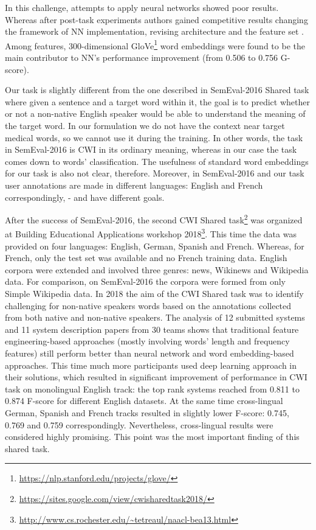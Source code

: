 In this challenge, attempts to apply neural networks showed poor results. Whereas after post-task experiments authors gained competitive results changing the framework of NN implementation, revising architecture and the feature set \citep{Bingel-SemEval2016}. Among features, 300-dimensional GloVe\footnote{\url{https://nlp.stanford.edu/projects/glove/}} word embeddings were found to be the main contributor to NN's performance improvement (from 0.506 to 0.756 G-score). 

Our task is slightly different from the one described in SemEval-2016 Shared task \citep{Paetzold-SemEval2016overview} where given a sentence and a target word within it, the goal is to predict whether or not a non-native English speaker would be able to understand the meaning of the target word. In our formulation we do not have the context near target medical words, so we cannot use it during the training. In other words, the task in SemEval-2016 is CWI in its ordinary meaning, whereas in our case the task comes down to words' classification. The usefulness of standard word embeddings for our task is also not clear, therefore. Moreover, in SemEval-2016 and our task user annotations are made in different languages: English and French correspondingly, -  and have different goals.

After the success of SemEval-2016, the second CWI Shared task\footnote{\url{https://sites.google.com/view/cwisharedtask2018/}} was organized at Building Educational Applications workshop 2018\footnote{\url{http://www.cs.rochester.edu/~tetreaul/naacl-bea13.html}}. This time the data was provided on four languages: English, German, Spanish and French. Whereas, for French, only the test set was available and no French training data. English corpora were extended and involved three genres: news, Wikinews and Wikipedia data. For comparison, on SemEval-2016 the corpora were formed from only Simple Wikipedia data. In 2018 the aim of the CWI Shared
task was to identify challenging for non-native speakers words based on the annotations collected from both native and non-native speakers. 
The analysis \citep{Yimam-BEA2018} of 12 submitted systems and 11 system description papers from 30 teams shows that traditional feature engineering-based approaches (mostly involving words' length and frequency features) still perform better than neural network and word embedding-based approaches. This time much more participants used deep learning approach in their solutions, which resulted in significant improvement of performance in CWI task on monolingual English track: the top rank systems reached from 0.811 to 0.874 F-score for different English datasets. At the same time cross-lingual German, Spanish and French tracks resulted in slightly lower F-score: 0.745, 0.769 and 0.759 correspondingly. Nevertheless, cross-lingual results were considered highly promising. This point was the most important finding of this shared task. 

